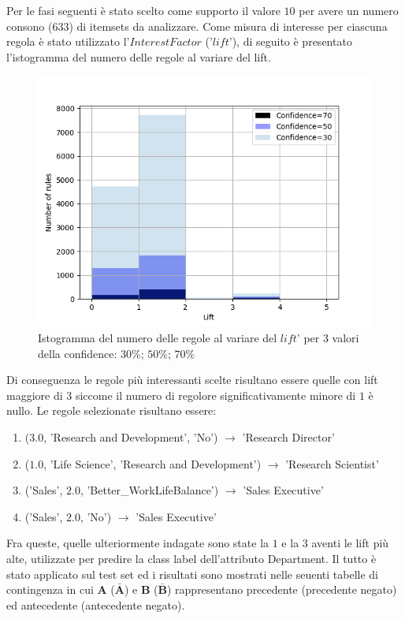 \documentclass[a4paper,9pt]{article}
\begin{document}
Per le fasi seguenti è stato scelto come supporto il valore $10$ per avere un numero consono ($633$) di itemsets da analizzare.
Come misura di interesse per ciascuna regola è stato utilizzato l'$Interest Factor$ ('$lift$'), di seguito è presentato l'istogramma del numero delle regole al variare del lift.  

\begin{figure}[H]
    \centering
    \includegraphics[scale=0.70]{lifthistogram.png}
    \caption{Istogramma del numero delle regole al variare del $lift$' per $3$ valori della confidence: $30\%$; $50\%$; $70\%$}
    \label{fig:my_label}
\end{figure}

Di conseguenza le regole più interessanti scelte risultano essere quelle con lift maggiore di $3$ siccome il numero di regolore significativamente  minore di $1$ è nullo. Le regole selezionate risultano essere:

\begin{enumerate}
\item ($3.0$, 'Research and Development', 'No') $\longrightarrow$ 'Research Director'
\item ($1.0$, 'Life Science', 'Research and Development') $\longrightarrow$ 'Research Scientist'
\item ('Sales', $2.0$, 'Better\_WorkLifeBalance') $\longrightarrow$ 'Sales Executive'
\item ('Sales', $2.0$, 'No') $\longrightarrow$ 'Sales Executive'
\end{enumerate}

Fra queste, quelle ulteriormente indagate sono state la $1$ e la $3$ aventi le lift più alte, utilizzate per predire la class label dell'attributo Department. Il tutto è stato applicato sul test set ed i risultati sono mostrati nelle seuenti tabelle di contingenza in cui \textbf {A}  ($\bar{\textbf {A}}$) e \textbf {B}  ($\bar{\textbf {B}}$) rappresentano precedente (precedente negato) ed antecedente (antecedente negato). 
\end{document}
